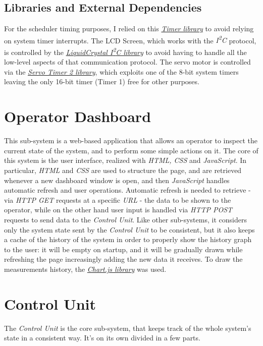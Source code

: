 \documentclass[a4paper,12pt]{report}
\begin{document}
		\subsection{Libraries and External Dependencies}
		For the scheduler timing purposes, I relied on this \href{https://github.com/sstaub/Timer}{\textit{Timer library}} to avoid relying on system timer interrupts.
		\newline The LCD Screen, which works with the \textit{I\textsuperscript{2}C} protocol, is controlled by the \href{https://docs.arduino.cc/libraries/liquidcrystal-i2c/}{\textit{LiquidCrystal I\textsuperscript{2}C library}} to avoid having to handle all the low-level aspects of that communication protocol.
		\newline The servo motor is controlled via the \href{https://github.com/nabontra/ServoTimer2}{\textit{Servo Timer 2 library}}, which exploits one of the 8-bit system timers leaving the only 16-bit timer (Timer 1) free for other purposes.
	\section{Operator Dashboard}
	This sub-system is a web-based application that allows an operator to inspect the current state of the system, and to perform some simple actions on it. The core of this system is the user interface, realized with \textit{HTML, CSS} and \textit{JavaScript}.
	\newline In particular, \textit{HTML} and \textit{CSS} are used to structure the page, and are retrieved whenever a new dashboard window is open, and then \textit{JavaScript} handles automatic refresh and user operations. Automatic refresh is needed to retrieve - via \textit{HTTP GET} requests at a specific \textit{URL} - the data to be shown to the operator, while on the other hand user input is handled via \textit{HTTP POST} requests to send data to the \textit{Control Unit}.
	\newline Like other sub-systems, it considers only the system state sent by the \textit{Control Unit} to be consistent, but it also keeps a cache of the history of the system in order to properly show the history graph to the user: it will be empty on startup, and it will be gradually drawn while refreshing the page increasingly adding the new data it receives.
	\newline To draw the measurements history, the \href{https://www.w3schools.com/ai/ai_chartjs.asp}{\textit{Chart.js library}} was used.
	\section{Control Unit}
	The \textit{Control Unit} is the core sub-system, that keeps track of the whole system's state in a consistent way. It's on its own divided in a few parts.
\end{document}
